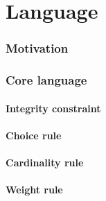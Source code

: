 \part{Language}
\section{Motivation}

\section{Core language}
\subsection{Integrity constraint}

\subsection{Choice rule}

\subsection{Cardinality rule}

\subsection{Weight rule}

% 
% 
%
